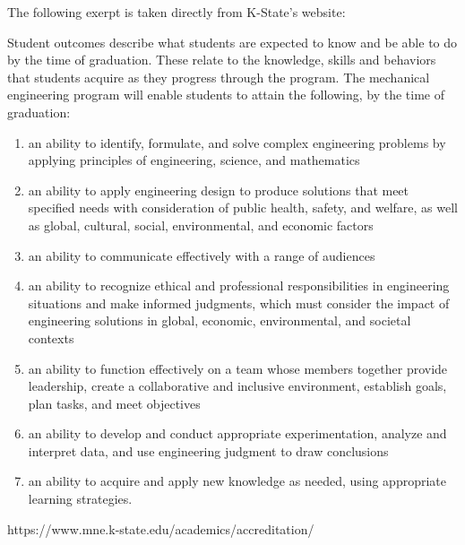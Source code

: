 The following exerpt is taken directly from K-State's website:

Student outcomes describe what students are expected to know and be 
able to do by the time of graduation. These relate to the knowledge, 
skills and behaviors that students acquire as they progress through 
the program. The mechanical engineering program will enable students 
to attain the following, by the time of graduation:
\begin{enumerate}
    \item an ability to identify, formulate, and solve complex engineering problems by applying principles of engineering, science, and mathematics
    \item an ability to apply engineering design to produce solutions that meet specified needs with consideration of public health, safety, and welfare, as well as global, cultural, social, environmental, and economic factors
    \item an ability to communicate effectively with a range of audiences
    \item an ability to recognize ethical and professional responsibilities in engineering situations and make informed judgments, which must consider the impact of engineering solutions in global, economic, environmental, and societal contexts
    \item an ability to function effectively on a team whose members together provide leadership, create a collaborative and inclusive environment, establish goals, plan tasks, and meet objectives
    \item an ability to develop and conduct appropriate experimentation, analyze and interpret data, and use engineering judgment to draw conclusions
    \item an ability to acquire and apply new knowledge as needed, using appropriate learning strategies.
\end{enumerate}

https://www.mne.k-state.edu/academics/accreditation/